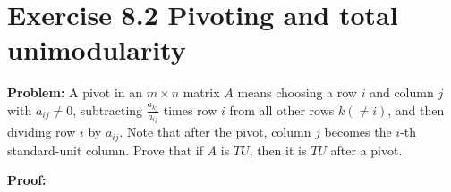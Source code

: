 \section{Exercise 8.2 Pivoting and total unimodularity}
\textbf{Problem:} A pivot in an $m\times{}n$ matrix $A$ means choosing a row $i$ and column $j$ with $a_{ij}\neq{}0$, subtracting $\frac{a_{kj}}{a_{ij}}$ times row $i$ from all other rows $k(\neq{}i)$, and then dividing row $i$ by $a_{ij}$. Note that after the pivot, column $j$ becomes the $i$-th standard-unit column. Prove that if $A$ is $TU$, then it is $TU$ after a pivot.

\textbf{Proof:} 